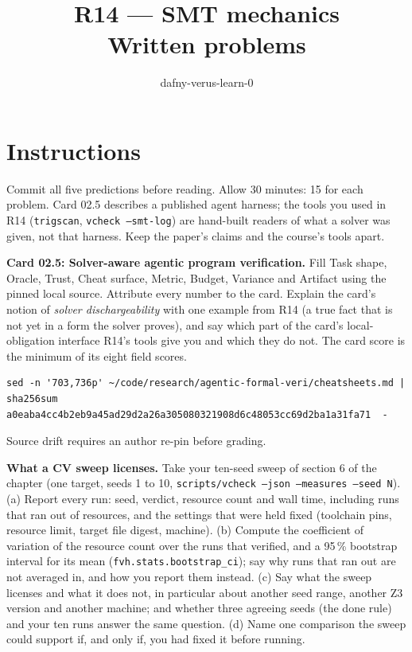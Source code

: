 \documentclass[11pt]{article}
\title{R14 --- SMT mechanics \\ \large Written problems}
\author{dafny-verus-learn-0}
\date{}
\begin{document}
\maketitle
\section*{Instructions}
Commit all five predictions before reading. Allow 30 minutes: 15 for each
problem. Card 02.5 describes a published agent harness; the tools you used in
R14 (\texttt{trigscan}, \texttt{vcheck --smt-log}) are hand-built readers of
what a solver was given, not that harness. Keep the paper's claims and the
course's tools apart.

\begin{problem}\label{prob:B1}
\textbf{Card 02.5: Solver-aware agentic program verification.} Fill Task
shape, Oracle, Trust, Cheat surface, Metric, Budget, Variance and Artifact
using the pinned local source. Attribute every number to the card. Explain the
card's notion of \emph{solver dischargeability} with one example from R14 (a
true fact that is not yet in a form the solver proves), and say which part of
the card's local-obligation interface R14's tools give you and which they do
not. The card score is the minimum of its eight field scores.
\begin{verbatim}
sed -n '703,736p' ~/code/research/agentic-formal-veri/cheatsheets.md | sha256sum
a0eaba4cc4b2eb9a45ad29d2a26a305080321908d6c48053cc69d2ba1a31fa71  -
\end{verbatim}
Source drift requires an author re-pin before grading.
\end{problem}

\begin{problem}[statistics]\label{prob:B2}
\textbf{What a CV sweep licenses.} Take your ten-seed sweep of section 6 of the
chapter (one target, seeds 1 to 10, \texttt{scripts/vcheck --json --measures
--seed N}). (a) Report every run: seed, verdict, resource count and wall time,
including runs that ran out of resources, and the settings that were held
fixed (toolchain pins, resource limit, target file digest, machine). (b)
Compute the coefficient of variation of the resource count over the runs that
verified, and a 95\,\% bootstrap interval for its mean
(\texttt{fvh.stats.bootstrap\_ci}); say why runs that ran out are not averaged
in, and how you report them instead. (c) Say what the sweep licenses and what
it does not, in particular about another seed range, another Z3 version and
another machine; and whether three agreeing seeds (the done rule) and your ten
runs answer the same question. (d) Name one comparison the sweep could support
if, and only if, you had fixed it before running.
\end{problem}
\end{document}
